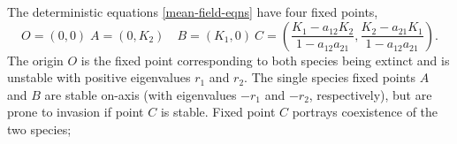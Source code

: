 \documentclass[a4paper,10pt]{article}
\numberwithin{equation}{section} %
\begin{document}
The deterministic equations \ref{mean-field-eqns} have four fixed points,%
\begin{equation}
 O = (0,0) \; A = (0,K_2) \quad B = (K_1,0) \: C = (\frac{K_1-a_{12} K_2}{1-a_{12}a_{21}},\frac{K_2-a_{21} K_1}{1-a_{12}a_{21}}). %
\end{equation}
The origin $O$ is the fixed point corresponding to both species being extinct and is unstable with positive eigenvalues $r_1$ and $r_2$. %
The single species fixed points $A$ and $B$ are stable on-axis (with eigenvalues $-r_1$ and $-r_2$, respectively), but are prone to invasion if point $C$ is stable. %
Fixed point $C$ portrays coexistence of the two species; 
%
%
\end{document}
